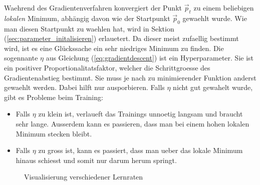 Waehrend des Gradientenverfahren konvergiert der Punkt $\vec{p}_t$ zu einem
beliebigen \textit{lokalen} Minimum, abhängig davon wie der Startpunkt
$\vec{p}_0$ gewaehlt wurde.
Wie man diesen Startpunkt zu waehlen hat, wird in Sektion
(\ref{sec:parameter_initalisieren}) erlauetert.
Da dieser meist zufaellig bestimmt wird, ist es eine Glückssache ein sehr niedriges Minimum zu finden.
\para{}
Die sogennante  $\eta$ aus Gleichung (\ref{eq:gradientdescent}) ist ein Hyperparameter.
Sie ist ein positiver Proportionalitatsfaktor, welcher die Schrittgroesse des Gradientenabstieg bestimmt. Sie muss je nach zu minimierender Funktion anderst gewaehlt werden.
Dabei hilft nur ausporbieren. Falls $\eta$ nicht gut gewahelt wurde, gibt es Probleme beim Training:
\begin{itemize}
\item{Falls $\eta$ zu klein ist, verlaueft das Trainings unnoetig langsam und braucht sehr lange.
    Ausserdem kann es passieren, dass man bei einem hohen lokalen Minimum stecken bleibt.}

\item{Falls $\eta$ zu gross ist, kann es passiert, dass man ueber das lokale
    Minimum hinaus schiesst und somit nur darum herum springt.}
\end{itemize}

\begin{figure}[h!]
  \centering
  \caption{Visualisierung verschiedener Lernraten}
\end{figure}


